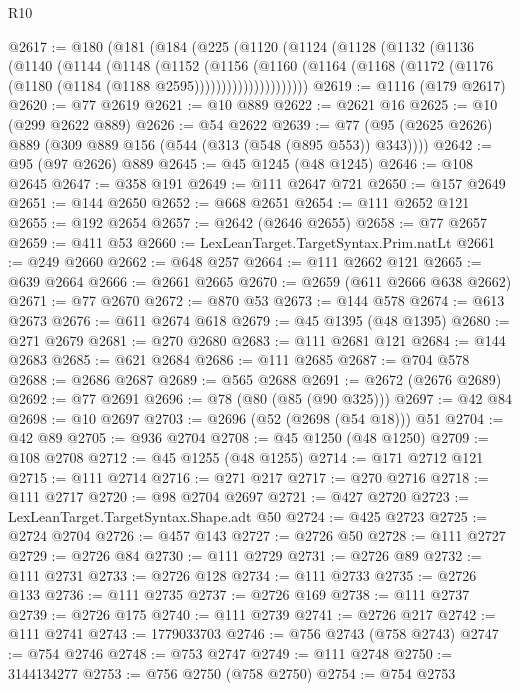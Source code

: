 \begin{lexlean}{R10}
\begin{coremodule}
@2617 := @180
    (@181
      (@184
        (@225
          (@1120
            (@1124
              (@1128
                (@1132
                  (@1136
                    (@1140
                      (@1144
                        (@1148
                          (@1152
                            (@1156
                              (@1160
                                (@1164
                                  (@1168
                                    (@1172 (@1176 (@1180 (@1184 (@1188 @2595)))))))))))))))))))))
@2619 := @1116 (@179 @2617)
@2620 := @77 @2619
@2621 := @10 @889
@2622 := @2621 @16
@2625 := @10 (@299 @2622 @889)
@2626 := @54 @2622
@2639 := @77 (@95 (@2625 @2626) @889 (@309 @889 @156 (@544 (@313 (@548 (@895 @553)) @343))))
@2642 := @95 (@97 @2626) @889
@2645 := @45 @1245 (@48 @1245)
@2646 := @108 @2645
@2647 := @358 @191
@2649 := @111 @2647 @721
@2650 := @157 @2649
@2651 := @144 @2650
@2652 := @668 @2651
@2654 := @111 @2652 @121
@2655 := @192 @2654
@2657 := @2642 (@2646 @2655)
@2658 := @77 @2657
@2659 := @411 @53
@2660 := LexLeanTarget.TargetSyntax.Prim.natLt
@2661 := @249 @2660
@2662 := @648 @257
@2664 := @111 @2662 @121
@2665 := @639 @2664
@2666 := @2661 @2665
@2670 := @2659 (@611 @2666 @638 @2662)
@2671 := @77 @2670
@2672 := @870 @53
@2673 := @144 @578
@2674 := @613 @2673
@2676 := @611 @2674 @618
@2679 := @45 @1395 (@48 @1395)
@2680 := @271 @2679
@2681 := @270 @2680
@2683 := @111 @2681 @121
@2684 := @144 @2683
@2685 := @621 @2684
@2686 := @111 @2685
@2687 := @704 @578
@2688 := @2686 @2687
@2689 := @565 @2688
@2691 := @2672 (@2676 @2689)
@2692 := @77 @2691
@2696 := @78 (@80 (@85 (@90 @325)))
@2697 := @42 @84
@2698 := @10 @2697
@2703 := @2696 (@52 (@2698 (@54 @18))) @51
@2704 := @42 @89
@2705 := @936 @2704
@2708 := @45 @1250 (@48 @1250)
@2709 := @108 @2708
@2712 := @45 @1255 (@48 @1255)
@2714 := @171 @2712 @121
@2715 := @111 @2714
@2716 := @271 @217
@2717 := @270 @2716
@2718 := @111 @2717
@2720 := @98 @2704 @2697
@2721 := @427 @2720
@2723 := LexLeanTarget.TargetSyntax.Shape.adt @50
@2724 := @425 @2723
@2725 := @2724 @2704
@2726 := @457 @143
@2727 := @2726 @50
@2728 := @111 @2727
@2729 := @2726 @84
@2730 := @111 @2729
@2731 := @2726 @89
@2732 := @111 @2731
@2733 := @2726 @128
@2734 := @111 @2733
@2735 := @2726 @133
@2736 := @111 @2735
@2737 := @2726 @169
@2738 := @111 @2737
@2739 := @2726 @175
@2740 := @111 @2739
@2741 := @2726 @217
@2742 := @111 @2741
@2743 := 1779033703
@2746 := @756 @2743 (@758 @2743)
@2747 := @754 @2746
@2748 := @753 @2747
@2749 := @111 @2748
@2750 := 3144134277
@2753 := @756 @2750 (@758 @2750)
@2754 := @754 @2753

\end{coremodule}
\end{lexlean}
